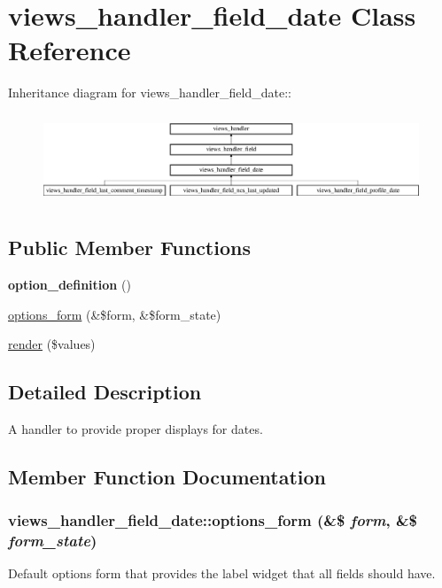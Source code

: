 \hypertarget{classviews__handler__field__date}{
\section{views\_\-handler\_\-field\_\-date Class Reference}
\label{classviews__handler__field__date}
}
Inheritance diagram for views\_\-handler\_\-field\_\-date::\begin{figure}[H]
\begin{center}
\leavevmode
\includegraphics[height=2.70531cm]{classviews__handler__field__date}
\end{center}
\end{figure}
\subsection*{Public Member Functions}
\begin{DoxyCompactItemize}
\item 
\hypertarget{classviews__handler__field__date_ac2c907d5403ef2085b21619293d701c4}{
{\bfseries option\_\-definition} ()}
\label{classviews__handler__field__date_ac2c907d5403ef2085b21619293d701c4}

\item 
\hyperlink{classviews__handler__field__date_acc152b1ff3dd0a65bc4d372c97c7c8e0}{options\_\-form} (\&\$form, \&\$form\_\-state)
\item 
\hyperlink{classviews__handler__field__date_a4ed821df9270dc90bd3c2103d7136d47}{render} (\$values)
\end{DoxyCompactItemize}


\subsection{Detailed Description}
A handler to provide proper displays for dates. 

\subsection{Member Function Documentation}
\hypertarget{classviews__handler__field__date_acc152b1ff3dd0a65bc4d372c97c7c8e0}{
\subsubsection[{options\_\-form}]{\setlength{\rightskip}{0pt plus 5cm}views\_\-handler\_\-field\_\-date::options\_\-form (\&\$ {\em form}, \/  \&\$ {\em form\_\-state})}}
\label{classviews__handler__field__date_acc152b1ff3dd0a65bc4d372c97c7c8e0}
Default options form that provides the label widget that all fields should have. 

